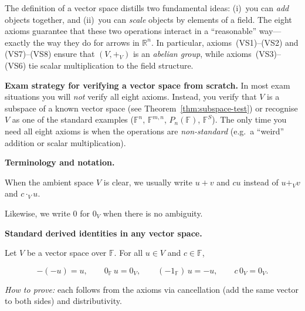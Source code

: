 The definition of a vector space distills two fundamental ideas: (i)~you can \emph{add} objects together, and (ii)~you can \emph{scale} objects by elements of a field.
The eight axioms guarantee that these two operations interact in a ``reasonable'' way---exactly the way they do for arrows in $\mathbb{R}^n$.
In particular, axioms~(VS1)--(VS2) and (VS7)--(VS8) ensure that $(V,+_V)$ is an \emph{abelian group}, while axioms~(VS3)--(VS6) tie scalar multiplication to the field structure.

\begin{examtip}
\textbf{Exam strategy for verifying a vector space from scratch.}
In most exam situations you will \emph{not} verify all eight axioms.  Instead, you verify that $V$ is a subspace of a known vector space (see Theorem~\ref{thm:subspace-test}) or recognise $V$ as one of the standard examples ($\mathbb{F}^n$, $\mathbb{F}^{m,n}$, $P_n(\mathbb{F})$, $\mathbb{F}^S$).
The only time you need all eight axioms is when the operations are \emph{non-standard} (e.g.\ a ``weird'' addition or scalar multiplication).
\end{examtip}

\begin{policynote}

\textbf{Terminology and notation.}

When the ambient space $V$ is clear, we usually write $u+v$ and $cu$ instead of $u+_V v$ and $c\cdot_V u$.

Likewise, we write $0$ for $0_V$ when there is no ambiguity.

\end{policynote}

\begin{keyformula}

\textbf{Standard derived identities in any vector space.}

Let $V$ be a vector space over $\mathbb{F}$. For all $u\in V$ and $c\in \mathbb{F}$,

\[
-(-u)=u,\qquad 0_{\mathbb{F}}\,u = 0_V,\qquad (-1_{\mathbb{F}})\,u = -u,\qquad c\,0_V = 0_V.
\]

\emph{How to prove:} each follows from the axioms via cancellation (add the same vector to both sides) and distributivity.

\end{keyformula}

